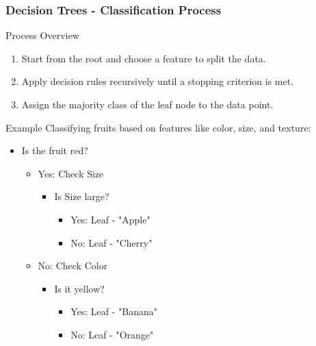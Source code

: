 \documentclass[aspectratio=169]{beamer}
\begin{document}
\begin{frame}[fragile]
    \frametitle{Decision Trees - Classification Process}
    \begin{block}{Process Overview}
        \begin{enumerate}
            \item Start from the root and choose a feature to split the data.
            \item Apply decision rules recursively until a stopping criterion is met.
            \item Assign the majority class of the leaf node to the data point.
        \end{enumerate}
    \end{block}
    
    \begin{block}{Example}
        Classifying fruits based on features like color, size, and texture:
        \begin{itemize}
            \item Is the fruit red? 
            \begin{itemize}
                \item Yes: Check Size
                \begin{itemize}
                    \item Is Size large? 
                    \begin{itemize}
                        \item Yes: Leaf - "Apple"
                        \item No: Leaf - "Cherry"
                    \end{itemize}
                \end{itemize}
                \item No: Check Color
                \begin{itemize}
                    \item Is it yellow? 
                    \begin{itemize}
                        \item Yes: Leaf - "Banana"
                        \item No: Leaf - "Orange"
                    \end{itemize}
                \end{itemize}
            \end{itemize}
        \end{itemize}
    \end{block}
\end{frame}
\end{document}

